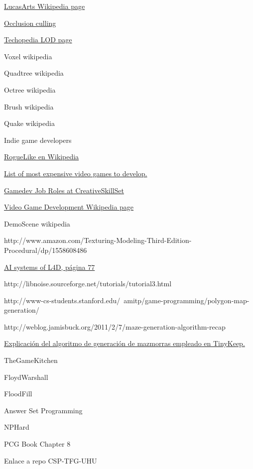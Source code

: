 \begin{thebibliography}{99}


 \href{https://es.wikipedia.org/wiki/LucasArts}{LucasArts Wikipedia page}

 \href{https://en.wikipedia.org/wiki/Hidden_surface_determination}{Occlusion culling}

 \href{http://www.techopedia.com/definition/11791/level-of-detail-lod}{Techopedia LOD page}

 Voxel wikipedia

 Quadtree wikipedia

 Octree wikipedia

 Brush wikipedia

 Quake wikipedia

 Indie game developers

 \href{https://es.wikipedia.org/wiki/Roguelike}{RogueLike en Wikipedia}

 \href{https://en.wikipedia.org/wiki/List_of_most_expensive_video_games_to_develop}{List of most expensive video games to develop.}

 \href{http://creativeskillset.org/creative_industries/games/job_roles}{Gamedev Job Roles at CreativeSkillSet}

 \href{https://en.wikipedia.org/wiki/Video_game_development#Roles}{Video Game Development Wikipedia page}

 DemoScene wikipedia

 http://www.amazon.com/Texturing-Modeling-Third-Edition-Procedural/dp/1558608486

 \href{http://www.valvesoftware.com/publications/2009/ai_systems_of_l4d_mike_booth.pdf}{AI systems of L4D, página 77}

 http://libnoise.sourceforge.net/tutorials/tutorial3.html

 http://www-cs-students.stanford.edu/~amitp/game-programming/polygon-map-generation/

 http://weblog.jamisbuck.org/2011/2/7/maze-generation-algorithm-recap

 \href{http://www.reddit.com/r/gamedev/comments/1dlwc4/procedural_dungeon_generation_algorithm_explained/}{Explicación del algoritmo de generación de mazmorras empleado en TinyKeep.}

 TheGameKitchen

 FloydWarshall

 FloodFill

 Answer Set Programming

 NPHard

 PCG Book Chapter 8

 Enlace a repo CSP-TFG-UHU

\end{thebibliography}







